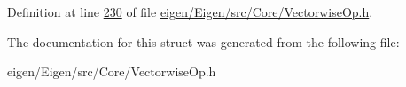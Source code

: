 Definition at line \hyperlink{eigen_2_eigen_2src_2_core_2_vectorwise_op_8h_source_l00230}{230} of file \hyperlink{eigen_2_eigen_2src_2_core_2_vectorwise_op_8h_source}{eigen/\+Eigen/src/\+Core/\+Vectorwise\+Op.\+h}.



The documentation for this struct was generated from the following file\+:\begin{DoxyCompactItemize}
\item 
eigen/\+Eigen/src/\+Core/\+Vectorwise\+Op.\+h\end{DoxyCompactItemize}
